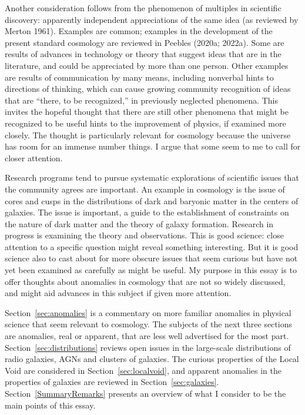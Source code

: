 \documentclass[fleqn,usenatbib]{mnras}
\begin{document}
Another consideration follows from the phenomenon of multiples in scientific discovery: apparently independent appreciations of the same idea (as reviewed by  Merton 1961). Examples are common; examples in the development of the present standard cosmology  are reviewed in Peebles (2020a; 2022a). Some are results of advances in technology or theory that suggest ideas that are in the literature, and could be appreciated by more than one person. Other examples are results of communication by many means, including  nonverbal hints to directions of thinking, which can cause growing community recognition of ideas that are ``there, to be recognized,'' in previously neglected phenomena. This invites the hopeful thought that there are still other phenomena that might be recognized to be useful hints to the improvement of physics, if examined more closely. The thought is particularly relevant for cosmology because the universe has room for an immense number things. I argue that some seem to me to call for closer attention. 

Research programs tend to pursue systematic explorations of scientific issues that the community agrees are important. An example in cosmology is the issue of cores and cusps in the distributions of dark and baryonic matter in the centers of galaxies. The issue is important, a guide to the establishment of constraints on the nature of dark matter and the theory of galaxy formation. Research in progress is examining the theory and observations. This is good science: close attention to a specific question might reveal something interesting. But it is good science also to cast about for more obscure issues that seem curious but have not yet been examined as carefully as might be useful. My purpose in this essay is to offer thoughts about anomalies in cosmology that are not so widely discussed, and might aid advances in this subject if given more attention. 

Section~\ref{sec:anomalies} is a commentary on more familiar anomalies in physical science that seem relevant to cosmology. The subjects of the next three sections are anomalies, real or apparent, that are less well advertised for the most part. Section~\ref{sec:distributions}  reviews open issues in the large-scale distributions of radio galaxies, AGNs and clusters of galaxies. The curious properties of the Local Void are considered in Section~\ref{sec:localvoid}, and apparent anomalies in the properties of galaxies are reviewed in Section~\ref{sec:galaxies}. Section~\ref{SummaryRemarks} presents an overview of what I consider to be the main points of this essay. 
\end{document}
